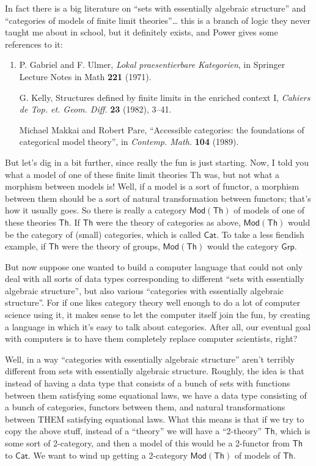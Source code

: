 \documentclass{article}
\begin{document}
In fact there is a big literature on ``sets with essentially algebraic
structure'' and ``categories of models of finite limit
theories''\ldots{} this is a branch of logic they never taught me about
in school, but it definitely exists, and Power gives some references to
it:

\begin{enumerate}
\def\labelenumi{\arabic{enumi})}
\setcounter{enumi}{2}
\item
  P. Gabriel and F. Ulmer, \emph{Lokal praesentierbare Kategorien}, in
  Springer Lecture Notes in Math \textbf{221} (1971).

  G. Kelly, Structures defined by finite limits in the enriched context
  I, \emph{Cahiers de Top. et. Geom. Diff.} \textbf{23} (1982), 3--41.

  Michael Makkai and Robert Pare, ``Accessible categories: the
  foundations of categorical model theory'', in \emph{Contemp. Math.}
  \textbf{104} (1989).
\end{enumerate}

But let's dig in a bit further, since really the fun is just starting.
Now, I told you what a model of one of these finite limit theories Th
was, but not what a morphism between models is! Well, if a model is a
sort of functor, a morphism between them should be a sort of natural
transformation between functors; that's how it usually goes. So there is
really a category \(\mathsf{Mod}(\mathsf{Th})\) of models of one of
these theories \(\mathsf{Th}\). If \(\mathsf{Th}\) were the theory of
categories as above, \(\mathsf{Mod}(\mathsf{Th})\) would be the category
of (small) categories, which is called \(\mathsf{Cat}\). To take a less
fiendish example, if \(\mathsf{Th}\) were the theory of groups,
\(\mathsf{Mod}(\mathsf{Th})\) would the category \(\mathsf{Grp}\).

But now suppose one wanted to build a computer language that could not
only deal with all sorts of data types corresponding to different ``sets
with essentially algebraic structure'', but also various ``categories
with essentially algebraic structure''. For if one likes category theory
well enough to do a lot of computer science using it, it makes sense to
let the computer itself join the fun, by creating a language in which
it's easy to talk about categories. After all, our eventual goal with
computers is to have them completely replace computer scientists, right?

Well, in a way ``categories with essentially algebraic structure''
aren't terribly different from sets with essentially algebraic
structure. Roughly, the idea is that instead of having a data type that
consists of a bunch of sets with functions between them satisfying some
equational laws, we have a data type consisting of a bunch of
categories, functors between them, and natural transformations between
THEM satisfying equational laws. What this means is that if we try to
copy the above stuff, instead of a ``theory'' we will have a
``2-theory'' \(\mathsf{Th}\), which is some sort of 2-category, and then
a model of this would be a 2-functor from \(\mathsf{Th}\) to
\(\mathsf{Cat}\). We want to wind up getting a 2-category
\(\mathsf{Mod}(\mathsf{Th})\) of models of \(\mathsf{Th}\).
\end{document}
